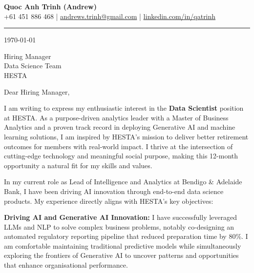 \documentclass[11pt, a4paper]{article}
\begin{document}
\begin{center}
    {\LARGE \textbf{Quoc Anh Trinh (Andrew)}}\\[4pt]
    {\small
        +61 451 886 468 \quad|\quad
        \href{mailto:andrews.trinh@gmail.com}{andrews.trinh@gmail.com} \quad|\quad
        \href{https://www.linkedin.com/in/qatrinh}{linkedin.com/in/qatrinh}
    }
\end{center}

\vspace{4pt}
\hrule
\vspace{14pt}

\today

\vspace{8pt}

Hiring Manager\\
Data Science Team\\
HESTA

\vspace{10pt}

Dear Hiring Manager,

I am writing to express my enthusiastic interest in the \textbf{Data Scientist} position at HESTA. As a purpose-driven analytics leader with a Master of Business Analytics and a proven track record in deploying Generative AI and machine learning solutions, I am inspired by HESTA’s mission to deliver better retirement outcomes for members with real-world impact. I thrive at the intersection of cutting-edge technology and meaningful social purpose, making this 12-month opportunity a natural fit for my skills and values.

In my current role as Lead of Intelligence and Analytics at Bendigo \& Adelaide Bank, I have been driving AI innovation through end-to-end data science products. My experience directly aligns with HESTA’s key objectives:

\textbf{Driving AI and Generative AI Innovation:}
I have successfully leveraged LLMs and NLP to solve complex business problems, notably co-designing an automated regulatory reporting pipeline that reduced preparation time by 80\%. I am comfortable maintaining traditional predictive models while simultaneously exploring the frontiers of Generative AI to uncover patterns and opportunities that enhance organisational performance.
\end{document}
